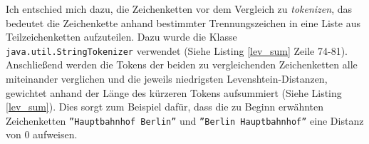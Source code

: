 Ich entschied mich dazu, die Zeichenketten vor dem Vergleich zu \textit{tokenizen}, das bedeutet die Zeichenkette anhand bestimmter Trennungszeichen in eine Liste aus Teilzeichenketten aufzuteilen. Dazu wurde die Klasse \texttt{java.util.StringTokenizer} verwendet (Siehe Listing \ref{lev_sum} Zeile 74-81). Anschließend werden die Tokens der beiden zu vergleichenden Zeichenketten alle miteinander verglichen und die jeweils niedrigsten Levenshtein-Distanzen, gewichtet anhand der Länge des kürzeren Tokens aufsummiert (Siehe Listing \ref{lev_sum}). Dies sorgt zum Beispiel dafür, dass die zu Beginn erwähnten Zeichenketten \texttt{''Hauptbahnhof Berlin''} und \texttt{''Berlin Hauptbahnhof''} eine Distanz von $0$ aufweisen.

